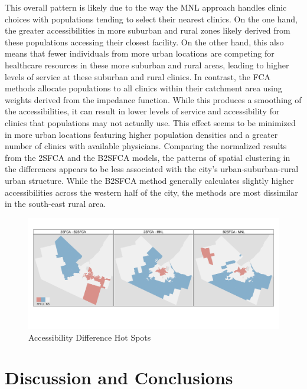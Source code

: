 \documentclass{article}
\begin{document}
This overall pattern is likely due to the way the MNL approach handles
clinic choices with populations tending to select their nearest clinics.
On the one hand, the greater accessibilities in more suburban and rural
zones likely derived from these populations accessing their closest
facility. On the other hand, this also means that fewer individuals from
more urban locations are competing for healthcare resources in these
more suburban and rural areas, leading to higher levels of service at
these suburban and rural clinics. In contrast, the FCA methods allocate
populations to all clinics within their catchment area using weights
derived from the impedance function. While this produces a smoothing of
the accessibilities, it can result in lower levels of service and
accessibility for clinics that populations may not actually use. This
effect seems to be minimized in more urban locations featuring higher
population densities and a greater number of clinics with available
physicians. Comparing the normalized results from the 2SFCA and the
B2SFCA models, the patterns of spatial clustering in the differences
appears to be less associated with the city's urban-suburban-rural urban
structure. While the B2SFCA method generally calculates slightly higher
accessibilities across the western half of the city, the methods are
most dissimilar in the south-east rural area.

\begin{figure}
\includegraphics[width=1\linewidth]{./img/access_locm_maps} \caption{\label{fig:access_locm_maps}Accessibility Difference Hot Spots}\label{fig:fig 4}
\end{figure}

\hypertarget{discussion-and-conclusions}{%
\section{Discussion and Conclusions}\label{discussion-and-conclusions}}
\end{document}
